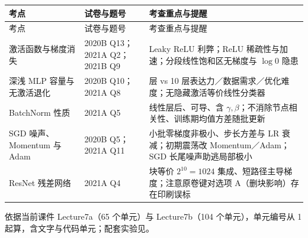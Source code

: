 \begingroup\small\setlength{\tabcolsep}{3pt}\renewcommand{\arraystretch}{1.22}
\begin{longtable}{@{}>{\raggedright\arraybackslash}p{}>{\raggedright\arraybackslash}p{}>{\raggedright\arraybackslash}p{}@{}}
\toprule
考点 & 试卷与题号 & 考查重点与提醒 \\
\midrule\endfirsthead
考点 & 试卷与题号 & 考查重点与提醒 \\
\midrule\endhead
\bottomrule\endfoot
激活函数与梯度消失 & 2020B Q13；2021A Q2；2021B Q9 & Leaky ReLU 利弊；ReLU 稀疏性与加速；分段线性饱和区无梯度与 $\log 0$ 隐患 \\
深浅 MLP 容量与无激活退化 & 2020B Q10；2021A Q8 & 1 层 vs 10 层表达力／数据需求／优化难度；无隐藏激活等价线性分类器 \\
BatchNorm 性质 & 2021A Q5 & 线性层后、可导、含 $\gamma,\beta$；不消除节点相关性、训练期均值方差随批更新 \\
SGD 噪声、Momentum 与 Adam & 2020B Q5；2021A Q11 & 小批零梯度非极小、步长方差与 LR 衰减；初期震荡改 Momentum／Adam；SGD 长尾噪声助逃局部极小 \\
ResNet 残差网络 & 2021A Q4 & 10 块等价 $2^{10}=1024$ 集成、短路径主导梯度；注意原卷键对选项 A（删块影响）存在印刷误标 \\
\end{longtable}\endgroup



依据当前课件 Lecture7a（65 个单元）与 Lecture7b（104 个单元），单元编号从 1 起算，含文字与代码单元；配套实验见。

